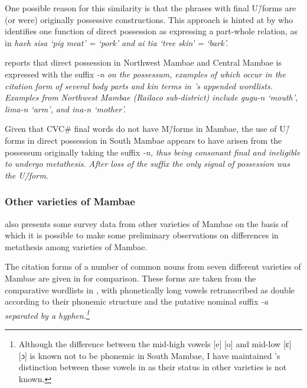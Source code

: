 One possible reason for this similarity
is that the phrases with final U\=/forms
are (or were) originally possessive constructions.
This approach is hinted at by \cite[147]{fo17} who
identifies one function of direct possession
as expressing a part-whole relation,
as in \it{haeh sisa} `pig meat' = `pork' and \it{ai tia} `tree skin' = `bark'.

\citet[146]{fo17} reports that direct possession in Northwest Mambae and Central Mambae
is expressed with the suffix \it{-n} on the possessum,
examples of which occur in the citation form of several
body parts and kin terms in \citeauthor{fo17}'s appended wordlists.
Examples from Northwest Mambae (Railaco sub-district) include
\it{gugu-n} `mouth', \it{lima-n} `arm', and \it{ina-n} `mother'.

Given that CVC{\#} final words do not have M\=/forms in Mambae,
the use of U\=/forms in direct possession in South Mambae
appears to have arisen from the possessum originally taking the suffix \it{-n},
thus being consonant final and ineligible to undergo metathesis.
After loss of the suffix the only signal of possession was the U\=/form.

\subsubsection{Other varieties of Mambae}\label{sec:OthVarMam}
\cite{fo17} also presents some survey data
from other varieties of Mambae on the basis of which
it is possible to make some preliminary observations on
differences in metathesis among varieties of Mambae.

The citation forms of a number of common nouns from
seven different varieties of Mambae are given in 
for comparison. These forms are taken from the comparative wordlists
in \cite{fo17}, with phonetically long vowels retranscribed
as double according to their phonemic structure
and the putative nominal suffix \it{-a} separated by a hyphen.\footnote{
	Although the difference between the mid-high vowels [e] [o] and mid-low [ɛ] [ɔ]
	is known not to be phonemic in South Mambae, I have maintained \citeauthor{fo17}'s
	distinction between these vowels in  as their status
	in other varieties is not known.}

